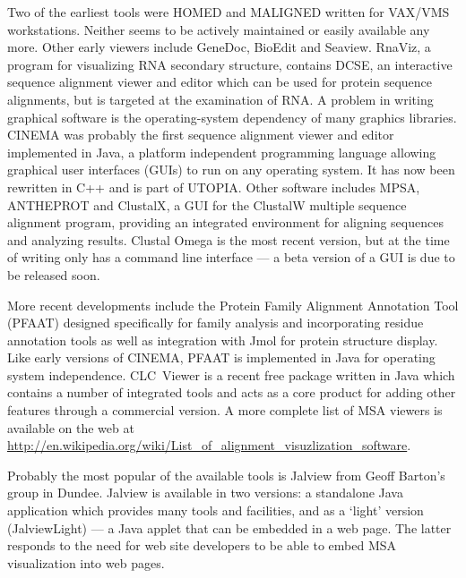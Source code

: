 \documentclass[a4]{bioinfo}
\begin{document}
Two of the earliest tools were HOMED\cite{stockwell:homed} and
MALIGNED\cite{clark:maligned} written for VAX/VMS workstations.
Neither seems to be actively maintained or easily available any
more. Other early viewers include GeneDoc\cite{nicholas:genedoc},
BioEdit and Seaview\cite{galtier:seaview}. RnaViz\cite{derijk:rnaviz},
a program for visualizing RNA secondary structure, contains
DCSE\cite{derijk:dcse}, an interactive sequence alignment viewer and
editor which can be used for protein sequence alignments, but is
targeted at the examination of RNA. A problem in writing graphical
software is the operating-system dependency of many graphics
libraries. CINEMA\cite{parrysmith:cinema} was probably the first
sequence alignment viewer and editor implemented in Java, a platform
independent programming language allowing graphical user interfaces
(GUIs) to run on any operating system. It has now been rewritten in
C++ and is part of UTOPIA\cite{pettifer:utopia}. Other software
includes MPSA\cite{blanchet:mpsa}, ANTHEPROT\cite{deleage:antheprot}
and ClustalX\cite{thompson:clustalx}, a GUI for the ClustalW multiple
sequence alignment program, providing an integrated environment for
aligning sequences and analyzing results. Clustal Omega is the most
recent version, but at the time of writing only has a command line
interface --- a beta version of a GUI is due to be released soon.

More recent developments include the Protein Family Alignment
Annotation Tool (PFAAT)\cite{johnson:pfaat} designed specifically for
family analysis and incorporating residue annotation tools as well as
integration with Jmol for protein structure display. Like early
versions of CINEMA, PFAAT is implemented in Java for operating system
independence. CLC~Viewer is a recent free package written in Java
which contains a number of integrated tools and acts as a core product
for adding other features through a commercial version.  A more
complete list of MSA viewers is available on the web at
\url{http://en.wikipedia.org/wiki/List_of_alignment_visuzlization_software}.

Probably the most popular of the available tools is Jalview from Geoff
Barton's group in Dundee\cite{clamp:jalview}. Jalview is available in
two versions: a standalone Java application which provides many tools
and facilities, and as a `light' version (JalviewLight) --- a Java
applet that can be embedded in a web page. The latter responds to the
need for web site developers to be able to embed MSA visualization
into web pages.
\end{document}
